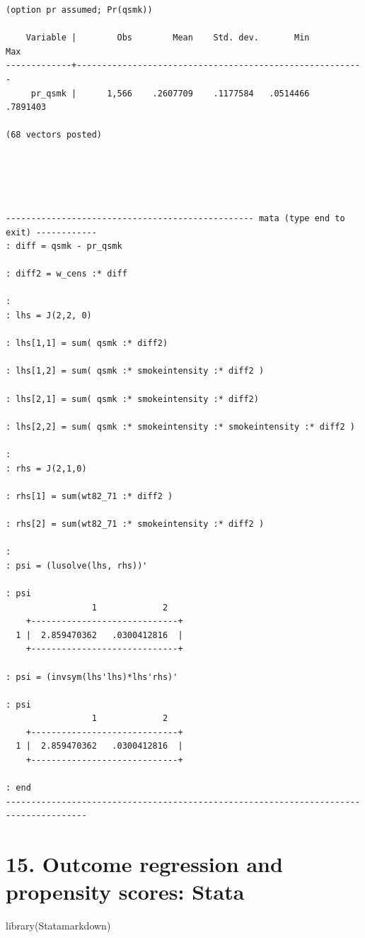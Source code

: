 \documentclass[
  10pt,
  a4paper,
]{book}
\newenvironment{Shaded}{\begin{snugshade}}{\end{snugshade}}
\newcommand{\FunctionTok}[1]{\textcolor[rgb]{0.28,0.35,0.67}{#1}}
\newcommand{\NormalTok}[1]{\textcolor[rgb]{0.00,0.46,0.62}{#1}}
\begin{document}
\begin{verbatim}
(option pr assumed; Pr(qsmk))

    Variable |        Obs        Mean    Std. dev.       Min        Max
-------------+---------------------------------------------------------
     pr_qsmk |      1,566    .2607709    .1177584   .0514466   .7891403

(68 vectors posted)





------------------------------------------------- mata (type end to exit) ------------
: diff = qsmk - pr_qsmk

: diff2 = w_cens :* diff

: 
: lhs = J(2,2, 0)

: lhs[1,1] = sum( qsmk :* diff2)

: lhs[1,2] = sum( qsmk :* smokeintensity :* diff2 )

: lhs[2,1] = sum( qsmk :* smokeintensity :* diff2)

: lhs[2,2] = sum( qsmk :* smokeintensity :* smokeintensity :* diff2 )

:                                                                 
: rhs = J(2,1,0)

: rhs[1] = sum(wt82_71 :* diff2 )

: rhs[2] = sum(wt82_71 :* smokeintensity :* diff2 )

: 
: psi = (lusolve(lhs, rhs))'

: psi
                 1             2
    +-----------------------------+
  1 |  2.859470362   .0300412816  |
    +-----------------------------+

: psi = (invsym(lhs'lhs)*lhs'rhs)'

: psi
                 1             2
    +-----------------------------+
  1 |  2.859470362   .0300412816  |
    +-----------------------------+

: end
--------------------------------------------------------------------------------------
\end{verbatim}

\hypertarget{outcome-regression-and-propensity-scores-stata}{%
\chapter*{15. Outcome regression and propensity scores: Stata}\label{outcome-regression-and-propensity-scores-stata}}

\begin{Shaded}
\begin{Highlighting}[]
\FunctionTok{library}\NormalTok{(Statamarkdown)}
\end{Highlighting}
\end{Shaded}
\end{document}
